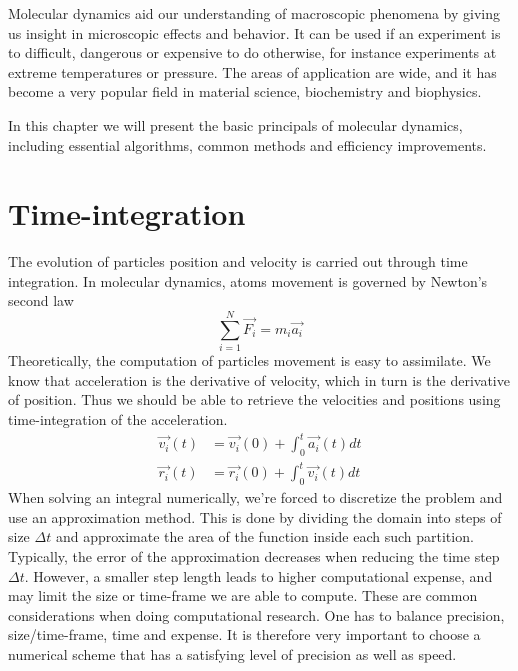 \documentclass[twoside,english]{uiofysmaster}
\begin{document}
Molecular dynamics aid our understanding of macroscopic phenomena by giving us insight in microscopic effects and behavior. 
It can be used if an experiment is to difficult, dangerous or expensive to do otherwise, for instance experiments at extreme temperatures or pressure. 
The areas of application are wide, and it has become a very popular field in material science, biochemistry and biophysics.

In this chapter we will present the basic principals of molecular dynamics, including essential algorithms, common methods and efficiency improvements.


\section{Time-integration}
The evolution of particles position and velocity is carried out through time integration.
In molecular dynamics, atoms movement is governed by Newton's second law
\begin{equation}
	\sum_{i=1}^{N}\vec{F_i} = m_i\vec{a_i}
\end{equation}
Theoretically, the computation of particles movement is easy to assimilate.
We know that acceleration is the derivative of velocity, which in turn is the derivative of position.
Thus we should be able to retrieve the velocities and positions using time-integration of the acceleration.
\begin{align}
	\vec{v_i}(t) &= \vec{v_i}(0) + \int_{0}^{t}\vec{a_i}(t) dt \\
	\vec{r_i}(t) &= \vec{r_i}(0) + \int_{0}^{t}\vec{v_i}(t) dt
\end{align}
When solving an integral numerically, we're forced to discretize the problem and use an approximation method.
This is done by dividing the domain into steps of size $\Delta t$ and approximate the area of the function inside each such partition.
Typically, the error of the approximation decreases when reducing the time step $\Delta t$. 
However, a smaller step length leads to higher computational expense, and may limit the size or time-frame we are able to compute. 
These are common considerations when doing computational research. 
One has to balance precision, size/time-frame, time and expense. 
It is therefore very important to choose a numerical scheme that has a satisfying level of precision as well as speed. 
\end{document}
